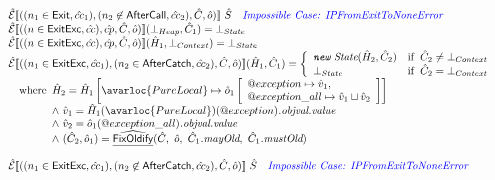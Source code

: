 \[\begin{array}{l}
\aE \lbr ( (n_1 \in \SF{Exit}, \hat{cc}_1), (n_2 \not\in \SF{AfterCall}, \hat{cc}_2), \hat{C}, \hat{o} ) \rbr\ \hat{S}
    \quad \comment{\inblue Impossible Case: IPFromExitToNoneError} \\

\aE \lbr ( (n \in \SF{ExitExc}, \hat{cc}), \acp, \hat{C},\hat{o} ) \rbr (\bot_{Heap}, \hat{C}_1)
    = \bot_{State}\\

\aE \lbr ( (n \in \SF{ExitExc}, \hat{cc}), \acp, \hat{C},\hat{o} ) \rbr (\hat{H}_1, \bot_{Context})
    = \bot_{State}\\

\aE \lbr ( (n_1 \in \SF{ExitExc}, \hat{cc}_1), (n_2 \in \SF{AfterCatch}, \hat{cc}_2), \hat{C}, \hat{o} ) \rbr (\hat{H}_1, \hat{C}_1)
   = \left\{
   \begin{array}{ll}
   \emph{\TT{new}\ State}(\hat{H}_2, \hat{C}_2) & \ifc{\hat{C}_2 \neq \bot_{Context}}\\
   \bot_{State} & \ifc{\hat{C}_2 = \bot_{Context}}\\
   \end{array}
   \right. \\
\quad\wherec{
    \hat{H}_2 = \hat{H}_1 \left[ \avarloc{PureLocal} \mapsto 
        \hat{o}_1 \left[ \begin{array}{ll}
		    \varprop{exception} \mapsto \hat{v}_1, \\
			\varprop{exception\_all} \mapsto \hat{v}_1 \sqcup \hat{v}_2
		\end{array} \right] \right] \\
	\land\ \hat{v}_1 = \hat{H}_1(\avarloc{PureLocal})(\varprop{exception})\emph{.objval.value}\\
	\land\ \hat{v}_2 = \hat{o}_1(\varprop{exception\_all})\emph{.objval.value}\\
	\land\ (\hat{C}_2, \hat{o}_1) = \ahf{FixOldify}(\hat{C},\ \hat{o},\ \hat{C}_1\emph{.mayOld},\ \hat{C}_1\emph{.mustOld})
}\\\\

\aE \lbr ( (n_1 \in \SF{ExitExc}, \hat{cc}_1), (n_2 \not\in \SF{AfterCatch}, \hat{cc}_2), \hat{C}, \hat{o} ) \rbr\ \hat{S}
    \quad \comment{\inblue Impossible Case: IPFromExitToNoneError} \\

\end{array}
\]

